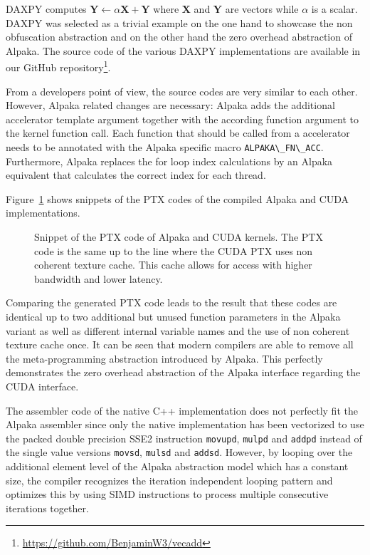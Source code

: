 \documentclass[10pt, twocolumn]{article}
\newcommand{\alpaka}{Alpaka\xspace}
\newcommand{\cuda}{{CUDA}\xspace}
\newcommand{\simd}{{SIMD}\xspace}
\newcommand{\github}{{GitHub}\xspace}
\newcommand{\cpp}[1]{\lstinline[identifierstyle=\color{black}\bfseries]{#1}}
\begin{document}
DAXPY computes $\boldsymbol{Y} \leftarrow \alpha \boldsymbol{X} + \boldsymbol{Y}$ where $\boldsymbol{X}$ and $\boldsymbol{Y}$ are vectors while $\alpha$ is a scalar.
DAXPY was selected as a trivial example on the one hand to showcase the non obfuscation abstraction and on the other hand the zero overhead abstraction of \alpaka.
The source code of the various DAXPY implementations are available in our \github repository\footnote{\url{https://github.com/BenjaminW3/vecadd}}.

From a developers point of view, the source codes are very similar to each other.
However, \alpaka related changes are necessary:
\alpaka adds the additional accelerator template argument together with the according function argument to the kernel function call.
Each function that should be called from a accelerator needs to be annotated with the \alpaka specific macro \cpp{ALPAKA\_FN\_ACC}.
Furthermore, \alpaka replaces the for loop index calculations by an \alpaka equivalent that calculates the correct index for each thread.





Figure~\ref{fig:ptx} shows snippets of the PTX codes of the compiled \alpaka and \cuda implementations.

\begin{figure}[tb]
  \centerline
      {}
          \caption{Snippet of the PTX code of \alpaka and \cuda kernels. The PTX code is the same up to the line where the \cuda PTX uses non coherent texture cache. This cache allows for access with higher bandwidth and lower latency.}
          \label{fig:ptx}
          \vspace{-1em}
\end{figure}

Comparing the generated PTX code leads to the result that these codes are identical up to two additional but unused function parameters in the \alpaka variant as well as different internal variable names and the use of non coherent texture cache once.
It can be seen that modern compilers are able to remove all the meta-programming abstraction introduced by \alpaka.
This perfectly demonstrates the zero overhead abstraction of the \alpaka interface regarding the \cuda interface.

The assembler code of the native C++ implementation does not perfectly fit the \alpaka assembler since only the native implementation has been vectorized to use the packed double precision SSE2 instruction \cpp{movupd}, \cpp{mulpd} and \cpp{addpd} instead of the single value versions \cpp{movsd}, \cpp{mulsd} and \cpp{addsd}.
However, by looping over the additional element level of the \alpaka abstraction model which has a constant size, the compiler recognizes the iteration independent looping pattern and optimizes this by using \simd instructions to process multiple consecutive iterations together.
\end{document}
